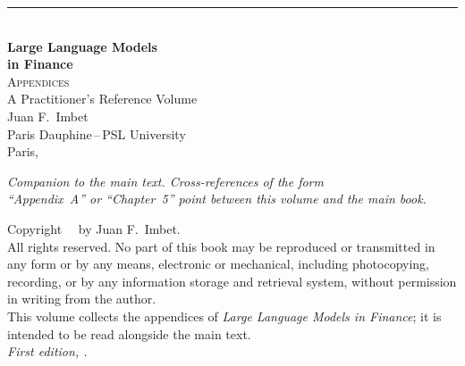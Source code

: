 \documentclass[12pt, openany, twoside]{book}
\begin{document}
\begin{titlepage}
  \thispagestyle{empty}
  \vspace*{3cm}
  \begin{center}
    {\rule{0.6\textwidth}{0.5pt}}\\[1.5cm]
    {\Large\bfseries Large Language Models\\[6pt] in Finance}\\[1.2cm]
    {\large\scshape Appendices}\\[0.4cm]
    {\small A Practitioner's Reference Volume}\\[1.8cm]
    {\large Juan F.\ Imbet}\\[0.4cm]
    {\small Paris Dauphine\,--\,PSL University}\\[2.1cm]
    {\small Paris, \the\year}
  \end{center}
  \vfill
  \begin{center}
    {\small\itshape Companion to the main text. Cross-references of the form\\
     ``Appendix~A'' or ``Chapter~5'' point between this volume and the main book.}
  \end{center}
\end{titlepage}

\newpage
\thispagestyle{empty}
\vspace*{\fill}
{\small
\noindent Copyright \textcopyright\ \the\year\ by Juan F.\ Imbet.\\[6pt]
All rights reserved. No part of this book may be reproduced or transmitted
in any form or by any means, electronic or mechanical, including photocopying,
recording, or by any information storage and retrieval system, without
permission in writing from the author.\\[12pt]
\noindent This volume collects the appendices of \textit{Large Language Models
in Finance}; it is intended to be read alongside the main text.\\[12pt]
\noindent\textit{First edition, \the\year.}
}

\frontmatter
\tableofcontents

\mainmatter
\appendix







\backmatter
\printbibliography[heading=bibintoc, title={References}]
\end{document}
